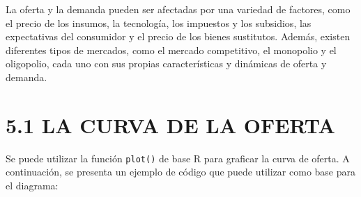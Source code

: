 \documentclass[
  spanish,
  12pt,
]{book}
\newenvironment{Shaded}{\begin{snugshade}}{\end{snugshade}}
\newcommand{\AttributeTok}[1]{\textcolor[rgb]{0.13,0.29,0.53}{#1}}
\newcommand{\CommentTok}[1]{\textcolor[rgb]{0.56,0.35,0.01}{\textit{#1}}}
\newcommand{\ConstantTok}[1]{\textcolor[rgb]{0.56,0.35,0.01}{#1}}
\newcommand{\DecValTok}[1]{\textcolor[rgb]{0.00,0.00,0.81}{#1}}
\newcommand{\FloatTok}[1]{\textcolor[rgb]{0.00,0.00,0.81}{#1}}
\newcommand{\FunctionTok}[1]{\textcolor[rgb]{0.13,0.29,0.53}{\textbf{#1}}}
\newcommand{\NormalTok}[1]{#1}
\newcommand{\OtherTok}[1]{\textcolor[rgb]{0.56,0.35,0.01}{#1}}
\newcommand{\SpecialCharTok}[1]{\textcolor[rgb]{0.81,0.36,0.00}{\textbf{#1}}}
\newcommand{\StringTok}[1]{\textcolor[rgb]{0.31,0.60,0.02}{#1}}
\begin{document}
La oferta y la demanda pueden ser afectadas por una variedad de
factores, como el precio de los insumos, la tecnología, los impuestos y
los subsidios, las expectativas del consumidor y el precio de los bienes
sustitutos. Además, existen diferentes tipos de mercados, como el
mercado competitivo, el monopolio y el oligopolio, cada uno con sus
propias características y dinámicas de oferta y demanda.

\newpage

\section{5.1 LA CURVA DE LA OFERTA}\label{la-curva-de-la-oferta}

Se puede utilizar la función \texttt{plot()} de base R para graficar la
curva de oferta. A continuación, se presenta un ejemplo de código que
puede utilizar como base para el diagrama:

\begin{Shaded}
\end{Shaded}
\end{document}
